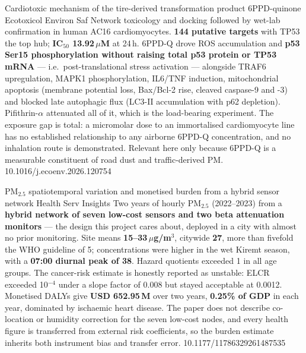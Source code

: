 \documentclass[10pt]{article}
\begin{document}
{Cardiotoxic mechanism of the tire-derived transformation product 6PPD-quinone}
{Ecotoxicol Environ Saf}
{Network toxicology and docking followed by wet-lab confirmation in human AC16
cardiomyocytes. \textbf{144 putative targets} with TP53 the top hub; \textbf{IC$_{50}$
13.92\,$\mu$M} at 24\,h. 6PPD-Q drove ROS accumulation and \textbf{p53 Ser15 phosphorylation
without raising total p53 protein or TP53 mRNA} --- i.e.\ post-translational stress
activation --- alongside TRAF6 upregulation, MAPK1 phosphorylation, IL6/TNF induction,
mitochondrial apoptosis (membrane potential loss, Bax/Bcl-2 rise, cleaved caspase-9 and -3)
and blocked late autophagic flux (LC3-II accumulation with p62 depletion). Pifithrin-$\alpha$
attenuated all of it, which is the load-bearing experiment. The exposure gap is total: a
micromolar dose to an immortalised cardiomyocyte line has no established relationship to any
airborne 6PPD-Q concentration, and no inhalation route is demonstrated. Relevant here only
because 6PPD-Q is a measurable constituent of road dust and traffic-derived PM.}
{10.1016/j.ecoenv.2026.120754}


{PM$_{2.5}$ spatiotemporal variation and monetised burden from a hybrid sensor network}
{Health Serv Insights}
{Two years of hourly PM$_{2.5}$ (2022--2023) from a \textbf{hybrid network of seven low-cost
sensors and two beta attenuation monitors} --- the design this project cares about, deployed
in a city with almost no prior monitoring. Site means \textbf{15--33\,$\mu$g/m$^3$}, citywide
\textbf{27}, more than fivefold the WHO guideline of 5; concentrations were higher in the wet
Kiremt season, with a \textbf{07:00 diurnal peak of 38}. Hazard quotients exceeded 1 in all
age groups. The cancer-risk estimate is honestly reported as unstable: ELCR exceeded
10$^{-4}$ under a slope factor of 0.008 but stayed acceptable at 0.0012. Monetised DALYs give
\textbf{USD 652.95\,M} over two years, \textbf{0.25\% of GDP} in each year, dominated by
ischaemic heart disease. The paper does not describe co-location or humidity correction for
the seven low-cost nodes, and every health figure is transferred from external risk
coefficients, so the burden estimate inherits both instrument bias and transfer error.}
{10.1177/11786329261487535}
\end{document}
